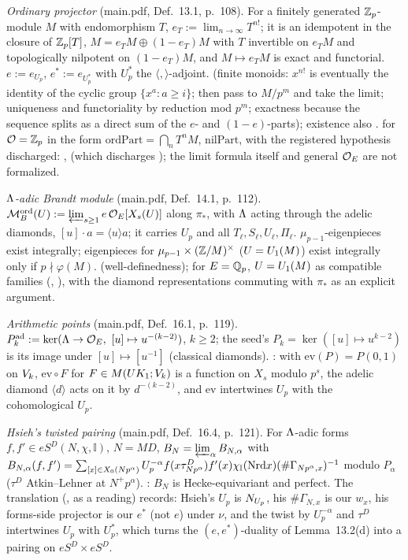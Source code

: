 \emph{Ordinary projector} (main.pdf, Def.~13.1, p.~108). For a finitely generated $\mathbb{Z}_p$-module $M$ with endomorphism $T$,
$e_T:=\lim_{n\to\infty}T^{n!}$; it is an idempotent in the closure of $\mathbb{Z}_p[T]$, $M=e_TM\oplus(1-e_T)M$ with $T$ invertible on
$e_TM$ and topologically nilpotent on $(1-e_T)M$, and $M\mapsto e_TM$ is exact and functorial. $e:=e_{U_p}$, $e^*:=e_{U_p^*}$ with
$U_p^*$ the $\langle,\rangle$-adjoint. \stproved{} (finite monoids: $x^{n!}$ is eventually the identity of the cyclic group
$\{x^a:a\ge i\}$; then pass to $M/p^m$ and take the limit; uniqueness and functoriality by reduction mod $p^m$; exactness because
the sequence splits as a direct sum of the $e$- and $(1-e)$-parts); existence also \stknown{} \cite[\S7.2, Lemma~1, p.~201]{Hi93}.
\stformal{} for $\mathcal{O}=\mathbb{Z}_p$ in the form $\mathrm{ordPart}=\bigcap_nT^nM$, $\mathrm{nilPart}$, with the registered hypothesis discharged:
,  (which discharges ); the limit
formula itself and general $\mathcal{O}_E$ are not formalized.

\emph{$\Lambda$-adic Brandt module} (main.pdf, Def.~14.1, p.~112). $\mathcal{M}^{\mathrm{ord}}_B(U):=\varprojlim_{s\ge1}e\,\mathcal{O}_E[X_s(U)]$ along $\pi_*$, with
$\Lambda$ acting through the adelic diamonds, $[u]\cdot a=\langle u\rangle a$; it carries $U_p$ and all $T_\ell,S_\ell,U_\ell,\Pi_\ell$.
$\mu_{p-1}$-eigenpieces exist integrally; eigenpieces for $\mu_{p-1}\times(\mathbb{Z}/M)^\times$ ($U=U_1(M)$) exist integrally only if
$p\nmid\varphi(M)$. \stproved{} (well-definedness); \stformal{} for $E=\mathbb{Q}_p$, $U=U_1(M)$ as compatible families
(, ), with the diamond representations commuting with $\pi_*$ as an
explicit argument.

\emph{Arithmetic points} (main.pdf, Def.~16.1, p.~119). $P^{\rm ad}_k:=\ker(\Lambda\to\mathcal{O}_E,\ [u]\mapsto u^{-(k-2)})$, $k\ge2$; the
seed's $P_k=\ker([u]\mapsto u^{k-2})$ is its image under $[u]\mapsto[u^{-1}]$ (classical diamonds). \stproved: with
$\mathrm{ev}(P)=P(0,1)$ on $V_k$, $\mathrm{ev}\circ F$ for $F\in M(UK_{1};V_k)$ is a function on $X_s$ modulo $p^s$, the adelic
diamond $\langle d\rangle$ acts on it by $d^{-(k-2)}$, and $\mathrm{ev}$ intertwines $U_p$ with the cohomological $U_p$.

\emph{Hsieh's twisted pairing} (main.pdf, Def.~16.4, p.~121). For $\Lambda$-adic forms $f,f'\in eS^D(N,\chi,\mathbb I)$, $N=MD$,
$B_N=\varprojlim_\alpha B_{N,\alpha}$ with
$B_{N,\alpha}(f,f')=\sum_{[x]\in X_0(Np^\alpha)}U_p^{-\alpha}f(x\tau^D_{Np^\alpha})f'(x)\chi_{\mathbb I}(\mathrm{Nrd} x)(\#\Gamma_{Np^\alpha,x})^{-1}$
modulo $P_\alpha$ ($\tau^D$ Atkin--Lehner at $N^+p^\alpha$). \stcited{} \cite[\S4.4, Def.~4.3, pp.~32--33]{Hs}: $B_N$ is
Hecke-equivariant and perfect. The translation (\stproved, as a reading) records: Hsieh's $U_p$ is $N_{U_p}$, his
$\#\Gamma_{N,x}$ is our $w_x$, his forms-side projector is our $e^*$ (not $e$) under $\nu$, and the twist by $U_p^{-\alpha}$ and
$\tau^D$ intertwines $U_p$ with $U_p^*$, which turns the $(e,e^*)$-duality of Lemma~13.2(d) into a pairing on $eS^D\times eS^D$.

